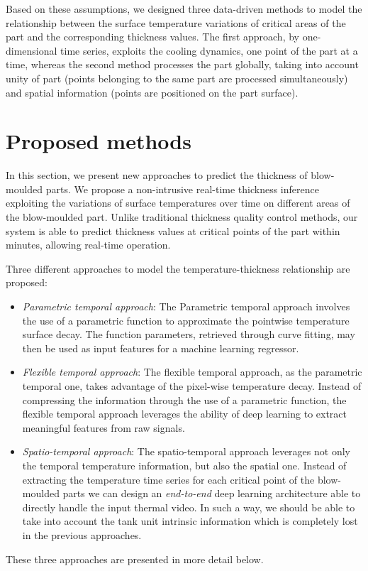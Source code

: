 Based on these assumptions, we designed three data-driven methods to model the relationship between the surface temperature variations of critical areas of the part and the corresponding thickness values. The first approach, by one-dimensional time series, exploits the cooling dynamics, one point of the part at a time, whereas the second method processes the part globally, taking into account unity of part (points belonging to the same part are processed simultaneously) and spatial information (points are positioned on the part surface).

\section{Proposed methods}

In this section, we present new approaches to predict the thickness of blow-moulded parts. We propose a non-intrusive real-time thickness inference exploiting the variations of surface temperatures over time on different areas of the blow-moulded part. 
Unlike traditional thickness quality control methods, our system is able to predict thickness values at critical points of the part within minutes, allowing real-time operation.

Three different approaches to model the temperature-thickness relationship are proposed:
%
\begin{itemize}
    \item \textit{Parametric temporal approach}: The Parametric temporal approach involves the use of a parametric function to approximate the pointwise temperature surface decay. The function parameters, retrieved through curve fitting, may then be used as input features for a machine learning regressor.
    \item \textit{Flexible temporal approach}: The flexible temporal approach, as the parametric temporal one, takes advantage of the pixel-wise temperature decay. Instead of compressing the information through the use of a parametric function, the flexible temporal approach leverages the ability of deep learning to extract meaningful features from raw signals.
    \item \textit{Spatio-temporal approach}: The spatio-temporal approach leverages not only the temporal temperature information, but also the spatial one. Instead of extracting the temperature time series for each critical point of the blow-moulded parts we can design an \textit{end-to-end} deep learning architecture able to directly handle the input thermal video. In such a way, we should be able to take into account the tank unit intrinsic information which is completely lost in the previous approaches.
\end{itemize}
%
These three approaches are presented in more detail below.

